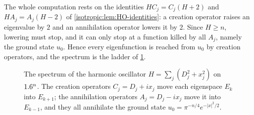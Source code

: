 \begin{discussion}
The whole computation rests on the identities $HC_j=C_j(H+2)$ and
$HA_j=A_j(H-2)$ of \cref{isotropic:lem:HO-identities}: a creation
operator raises an eigenvalue by $2$ and an annihilation operator lowers it
by $2$. Since $H\ge n$, lowering must stop, and it can only stop at a
function killed by all $A_j$, namely the ground state $u_0$. Hence every
eigenfunction is reached from $u_0$ by creation operators, and the spectrum
is the ladder of \cref{isotropic:fig:HO-ladder}.
\end{discussion}

\begin{figure}[htbp]
\centering
{}
\caption[Spectrum of the harmonic oscillator]{The spectrum of the harmonic
oscillator $H=\sum_j(D_j^2+x_j^2)$ on $1.6^n$. The creation operators
$C_j=D_j+ix_j$ move each eigenspace $E_k$ into $E_{k+1}$; the annihilation
operators $A_j=D_j-ix_j$ move it into $E_{k-1}$, and they all annihilate the
ground state $u_0=\pi^{-n/4}e^{-|x|^2/2}$.}
\label{isotropic:fig:HO-ladder}
\end{figure}

